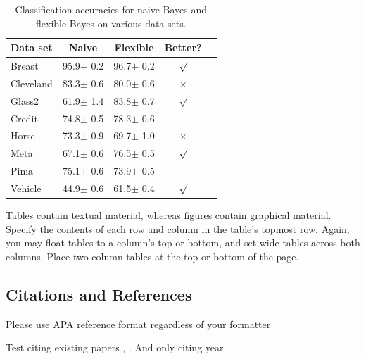 \documentclass{article}
\begin{document}

\begin{table}[t]
\caption{Classification accuracies for naive Bayes and flexible
Bayes on various data sets.}
\label{sample-table}
\vskip 0.15in
\begin{center}
\begin{small}
\begin{sc}
\begin{tabular}{lcccr}
\toprule
Data set & Naive & Flexible & Better? \\
\midrule
Breast    & 95.9$\pm$ 0.2& 96.7$\pm$ 0.2& $\surd$ \\
Cleveland & 83.3$\pm$ 0.6& 80.0$\pm$ 0.6& $\times$\\
Glass2    & 61.9$\pm$ 1.4& 83.8$\pm$ 0.7& $\surd$ \\
Credit    & 74.8$\pm$ 0.5& 78.3$\pm$ 0.6&         \\
Horse     & 73.3$\pm$ 0.9& 69.7$\pm$ 1.0& $\times$\\
Meta      & 67.1$\pm$ 0.6& 76.5$\pm$ 0.5& $\surd$ \\
Pima      & 75.1$\pm$ 0.6& 73.9$\pm$ 0.5&         \\
Vehicle   & 44.9$\pm$ 0.6& 61.5$\pm$ 0.4& $\surd$ \\
\bottomrule
\end{tabular}
\end{sc}
\end{small}
\end{center}
\vskip -0.1in
\end{table}

Tables contain textual material, whereas figures contain graphical material.
Specify the contents of each row and column in the table's topmost
row. Again, you may float tables to a column's top or bottom, and set
wide tables across both columns. Place two-column tables at the
top or bottom of the page.

\subsection{Citations and References}

Please use APA reference format regardless of your formatter

Test citing existing papers \cite{alzantot-etal-2018-generating}, \cite{ren-etal-2019-generating}.
And only citing year 
\end{document}
